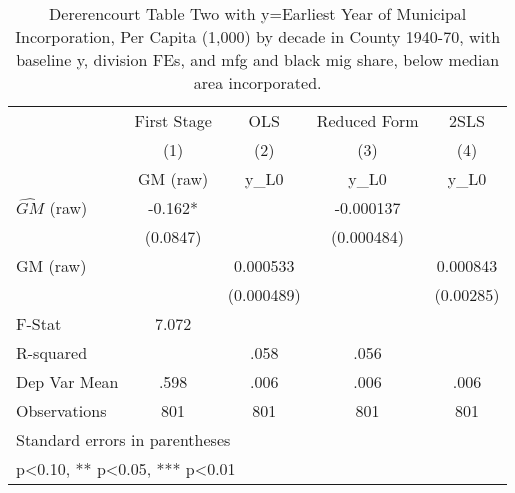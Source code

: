 \begin{table}[htbp]\centering
\def\sym#1{\ifmmode^{#1}\else\(^{#1}\)\fi}
\caption{Dererencourt Table Two with y=Earliest Year of Municipal Incorporation, Per Capita (1,000) by decade in County 1940-70, with baseline y, division FEs, and mfg and black mig share, below median area incorporated.}
\begin{tabular}{l*{4}{c}}
\toprule
                    & First Stage   &         OLS   &Reduced Form   &        2SLS   \\
                    &\multicolumn{1}{c}{(1)}&\multicolumn{1}{c}{(2)}&\multicolumn{1}{c}{(3)}&\multicolumn{1}{c}{(4)}\\
                    &\multicolumn{1}{c}{GM  (raw)}&\multicolumn{1}{c}{y\_L0}&\multicolumn{1}{c}{y\_L0}&\multicolumn{1}{c}{y\_L0}\\
\midrule
$\hat{GM}$ (raw)    &      -0.162*  &               &   -0.000137   &               \\
                    &    (0.0847)   &               &  (0.000484)   &               \\
\addlinespace
GM  (raw)           &               &    0.000533   &               &    0.000843   \\
                    &               &  (0.000489)   &               &   (0.00285)   \\
\midrule
F-Stat              &       7.072   &               &               &               \\
R-squared           &               &        .058   &        .056   &               \\
Dep Var Mean        &        .598   &        .006   &        .006   &        .006   \\
Observations        &         801   &         801   &         801   &         801   \\
\bottomrule
\multicolumn{5}{l}{\footnotesize Standard errors in parentheses}\\
\multicolumn{5}{l}{\footnotesize * p<0.10, ** p<0.05, *** p<0.01}\\
\end{tabular}
\end{table}
